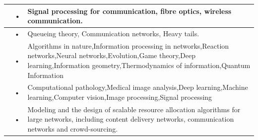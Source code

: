 \documentclass[openany]{book} %
\begin{document}
\begin{tabular}{p{3.5cm} p{3.5cm}p{9cm}}
\hline 
\href{https://www.ee.iitb.ac.in/~akumar/}{\color{blue}{Prof. Kumar Appaiah}}& • & Signal processing for communication, fibre optics, wireless communication. \\ 
\hline 
\href{https://www.ee.iitb.ac.in/~jayakrishnan.nair/}{\color{blue}{Prof. Jaykrishnan U. Nair }}& • & Queueing theory, Communication networks, Heavy tails. \\ 
\hline 
\href{https://www.ee.iitb.ac.in/~manojg/}{\color{blue}{Prof. Manoj Gopalkrishnan}} & • & Algorithms in nature,Information processing in networks,Reaction networks,Neural networks,Evolution,Game theory,Deep learning,Information geometry,Thermodynamics of information,Quantum Information\\ 
\hline 
\href{https://www.ee.iitb.ac.in/~asethi/}{\color{blue}{Prof. Amit Sethi }}& • & Computational pathology,Medical image analysis,Deep learning,Machine learning,Computer vision,Image processing,Signal processing \\ 
\hline 
\href{https://sites.google.com/site/sharayumoharir/}{\color{blue}{Prof. Sharayu Moharir }}& • & Modeling and the design of scalable resource allocation algorithms for large networks, including content delivery networks, communication
networks and crowd-sourcing. \\ 
\hline 
\end{tabular} 
\end{document}
